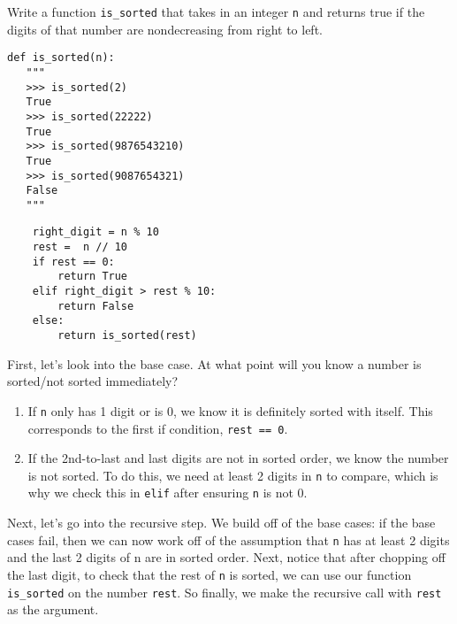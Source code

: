 \begin{blocksection}
\question Write a function \lstinline$is_sorted$ that takes in an integer
\lstinline$n$ and returns true if the digits of that number are nondecreasing from
right to left.

\begin{lstlisting}
def is_sorted(n):
   """
   >>> is_sorted(2)
   True
   >>> is_sorted(22222)
   True
   >>> is_sorted(9876543210)
   True
   >>> is_sorted(9087654321)
   False
   """
\end{lstlisting}
\end{blocksection}


\begin{blocksection}
\begin{solution}[1in]
\begin{lstlisting}
    right_digit = n % 10
    rest =  n // 10
    if rest == 0:
        return True
    elif right_digit > rest % 10:
        return False
    else:
        return is_sorted(rest)
\end{lstlisting}

First, let’s look into the base case. At what point will you know a number is sorted/not sorted immediately?
\begin{enumerate}
\item If \lstinline{n} only has 1 digit or is 0, we know it is definitely sorted with itself. This corresponds to the first if condition, \lstinline{rest == 0}. 
\item If the 2nd-to-last and last digits are not in sorted order, we know the number is not sorted. To do this, we need at least 2 digits in \lstinline{n} to compare, which is why we check this in \lstinline{elif} after ensuring \lstinline{n} is not 0. 
\end{enumerate}

Next, let’s go into the recursive step. We build off of the base cases: if the base cases fail, then we can now work off of the assumption that \lstinline{n} has at least 2 digits and the last 2 digits of n are in sorted order. Next, notice that after chopping off the last digit, to check that the rest of \lstinline{n} is sorted, we can use our function \lstinline{is_sorted} on the number \lstinline{rest}. So finally, we make the recursive call with \lstinline{rest} as the argument.

\end{solution}
\end{blocksection}

